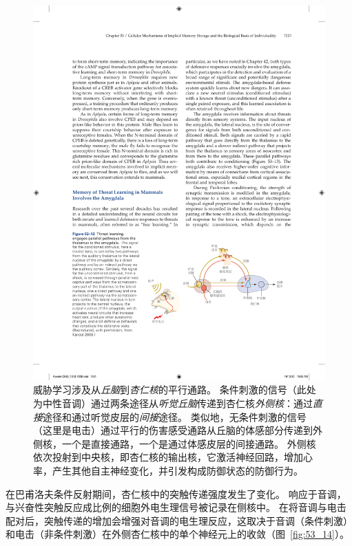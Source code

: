\begin{figure}[htbp]
	\centering
	\includegraphics[width=0.8\linewidth]{chap53/fig_53_13}
	\caption{威胁学习涉及从\textit{丘脑}到\textit{杏仁核}的平行通路。
		条件刺激的信号（此处为中性音调）通过两条途径从\textit{听觉丘脑}传递到杏仁核\textit{外侧核}：通过\textit{直接}途径和通过听觉皮层的\textit{间接}途径。
		类似地，无条件刺激的信号（这里是电击）通过平行的伤害感受通路从丘脑的体感部分传递到外侧核，一个是直接通路，一个是通过体感皮层的间接通路。
		外侧核依次投射到中央核，即杏仁核的输出核，它激活神经回路，增加心率，产生其他自主神经变化，并引发构成防御状态的防御行为\cite{kandel2007search}。}
	\label{fig:53_13}
\end{figure}


在巴甫洛夫条件反射期间，杏仁核中的突触传递强度发生了变化。
响应于音调，与兴奋性突触反应成比例的细胞外电生理信号被记录在侧核中。
在将音调与电击配对后，突触传递的增加会增强对音调的电生理反应，这取决于音调（条件刺激）和电击（非条件刺激）在外侧杏仁核中的单个神经元上的收敛（图~\ref{fig:53_14}）。


